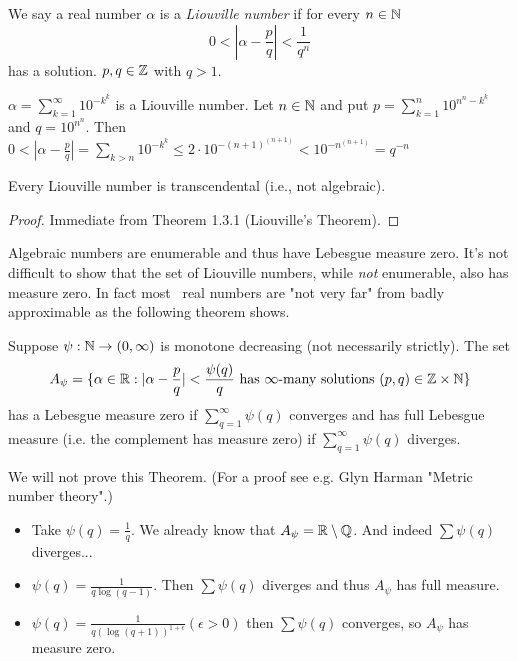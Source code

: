 \documentclass[NumTh.tex]{subfiles}
\begin{document}
We say a real number $\alpha$ is a \emph{Liouville number} if for every $n \in \mathbb{N}$
\[ 0 < |\alpha - \frac{p}{q}| < \frac{1}{q^n} \]
has a solution. $p,q \in \mathbb{Z}$ with $q > 1$.

\begin{ex}
  $\alpha = \sum_{k = 1}^\infty 10^{-k^k}$ is a Liouville number.
  Let $n \in\mathbb{N}$ and put $p = \sum_{k=1}^n 10^{n^n - k^k}$ and $q = 10^{n^n}$.
  Then $ 0 < |\alpha - \frac{p}{q}| = \sum_{k>n} 10^{-k^k} \leq 2\cdot 10^{-(n+1)^{(n+1)}} < 10^{-n^{(n+1)}} = q^{-n}$
\end{ex}

\begin{cor}\label{1_3_2}
  Every Liouville number is transcendental (i.e., not algebraic).
\end{cor}

\begin{proof}
  Immediate from Theorem 1.3.1 (Liouville's Theorem).
\end{proof}

  Algebraic numbers are enumerable and thus have Lebesgue measure zero.
  It's not difficult to show that the set of Liouville numbers, while \emph{not} enumerable, also has measure zero.
  In fact \grqq most\grqq ~ real numbers are "not very far" from badly approximable as the following theorem shows.

\begin{theorem}[Khintchine]\label{1_3_3}
  Suppose $\psi: \mathbb{N} \to (0,\infty)$ is monotone decreasing (not necessarily strictly).
  The set 
  \[A_\psi = \{\alpha \in \mathbb{R}: |\alpha - \frac{p}{q}| < \frac{\psi(q)}{q} \text{ has $\infty$-many solutions } (p,q) \in \mathbb{Z} \times \mathbb{N} \} \]
  has a Lebesgue measure zero if $\sum_{q=1}^\infty \psi(q)$ converges and has full Lebesgue measure (i.e. the complement has measure zero) 
  if $\sum_{q=1}^\infty \psi(q)$ diverges.
\end{theorem}

We will not prove this Theorem. (For a proof see e.g. Glyn Harman "Metric number theory".)

\begin{ex}
  \begin{itemize}
    \item Take $\psi(q) = \frac{1}{q}$. We already know that $A_\psi = \mathbb{R} \setminus \mathbb{Q}$.
    And indeed $\sum \psi(q)$ diverges...
    \item $\psi(q) = \frac{1}{q \log(q-1)}$. Then $\sum \psi(q)$ diverges and thus $A_\psi$ has full measure.
    \item $\psi(q) = \frac{1}{q (\log(q+1))^{1+\epsilon}} (\epsilon > 0)$ then $\sum \psi(q)$ converges,
    so $A_\psi$ has measure zero.
  \end{itemize}
\end{ex}
\end{document}
